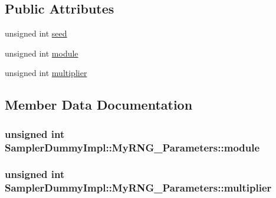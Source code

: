 \subsection*{Public Attributes}
\begin{DoxyCompactItemize}
\item 
unsigned int \hyperlink{class_sampler_dummy_impl_1_1_my_r_n_g___parameters_a20dd6b48cb11bfefeaf8efc8f9a8c588}{seed}
\item 
unsigned int \hyperlink{class_sampler_dummy_impl_1_1_my_r_n_g___parameters_a211123b0c8239821a17e0c209f2d88f6}{module}
\item 
unsigned int \hyperlink{class_sampler_dummy_impl_1_1_my_r_n_g___parameters_a3fb380d0315358ef6913f43941bb1e60}{multiplier}
\end{DoxyCompactItemize}


\subsection{Member Data Documentation}
\subsubsection[{\texorpdfstring{module}{module}}]{\setlength{\rightskip}{0pt plus 5cm}unsigned int Sampler\+Dummy\+Impl\+::\+My\+R\+N\+G\+\_\+\+Parameters\+::module}\hypertarget{class_sampler_dummy_impl_1_1_my_r_n_g___parameters_a211123b0c8239821a17e0c209f2d88f6}{}\label{class_sampler_dummy_impl_1_1_my_r_n_g___parameters_a211123b0c8239821a17e0c209f2d88f6}
\subsubsection[{\texorpdfstring{multiplier}{multiplier}}]{\setlength{\rightskip}{0pt plus 5cm}unsigned int Sampler\+Dummy\+Impl\+::\+My\+R\+N\+G\+\_\+\+Parameters\+::multiplier}\hypertarget{class_sampler_dummy_impl_1_1_my_r_n_g___parameters_a3fb380d0315358ef6913f43941bb1e60}{}\label{class_sampler_dummy_impl_1_1_my_r_n_g___parameters_a3fb380d0315358ef6913f43941bb1e60}
